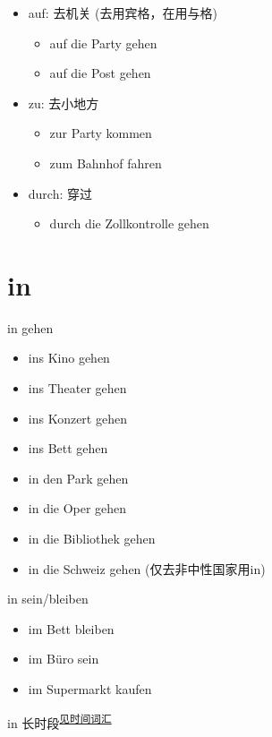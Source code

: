 \begin{itemize}
    \item auf: 去机关 \diam[border=true] (去用宾格，在用与格)
          \begin{itemize}
              \item auf die Party gehen
              \item auf die Post gehen
          \end{itemize}
    \item zu: 去小地方 \olive[border=true]
          \begin{itemize}
              \item zur Party kommen
              \item zum Bahnhof fahren
          \end{itemize}
    \item durch: 穿过 \diam[border=true]
          \begin{itemize}
              \item durch die Zollkontrolle gehen
          \end{itemize}
\end{itemize}

\section{in}
in \diam[border=true] gehen
\begin{itemize}
    \item ins Kino gehen
    \item ins Theater gehen
    \item ins Konzert gehen
    \item ins Bett gehen
    \item in den Park gehen
    \item in die Oper gehen
    \item in die Bibliothek gehen
    \item in die Schweiz gehen (仅去非中性国家用in)
\end{itemize}

in \olive[border=true] sein/bleiben
\begin{itemize}
    \item im Bett bleiben
    \item im Büro sein
    \item im Supermarkt kaufen
\end{itemize}

in \olive[border=true] 长时段\textsuperscript{\hyperref[time:prep:in]{见时间词汇}}

